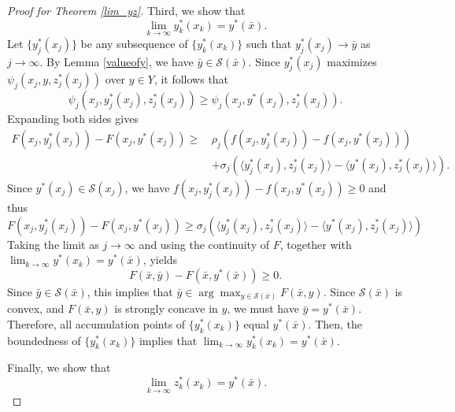 \documentclass[10pt,a4paper]{amsart}
\begin{document}
\begin{proof}[Proof for Theorem \ref{lim_yz}]
Third, we show that
\[
    \lim_{k \to\infty}y_k^*(x_k)=y^*(\bar{x}).
\]
Let $\{y_j^*(x_j)\}$ be any subsequence of $\{y_k^*(x_k)\}$ such that $y_j^*(x_j) \rightarrow \bar{y}$ as $j \rightarrow \infty$.
By Lemma \ref{valueofy}, we have $\bar{y} \in \mathcal{S}(\bar{x})$.
Since $y_j^*(x_j)$ maximizes $\psi_{j}(x_j, y, z_j^*(x_j))$ over $y \in Y$, it follows that
\[
\psi_{j}(x_j, y_j^*(x_j), z_j^*(x_j)) \ge \psi_{j}(x_j, y^*(x_j), z_j^*(x_j)). 
\]
Expanding both sides gives
\[
\begin{aligned}
    F(x_{j},y_{j}^*(x_{j}))-F(x_{j}, y^*(x_j)) \ge \, &\rho_{j}\left( f(x_{j}, y_{j}^*(x_{j}))-f(x_{j},y^*(x_j))\right) \\
    &+\sigma_{j}\left(\langle y_{j}^*(x_{j}), z_j^*(x_j)\rangle-\langle y^*(x_j), z_j^*(x_j)\rangle \right).
\end{aligned}
\]
Since $y^*(x_j) \in \mathcal{S}(x_j)$, we have $f(x_{j}, y_{j}^*(x_{j}))-f(x_{j},y^*(x_j)) \ge 0$ and thus
\[
 F(x_{j},y_{j}^*(x_{j}))-F(x_{j}, y^*(x_j)) \ge \sigma_{j}\left(\langle y_{j}^*(x_{j}), z_j^*(x_j)\rangle-\langle y^*(x_j), z_j^*(x_j)\rangle \right)
\]
Taking the limit as $j \rightarrow \infty$ and using the continuity of $F$, together with $ \lim_{k \to\infty}y^*(x_k)=y^*(\bar{x})$, yields
\[
F( \bar{x}, \bar{y} ) - F(\bar{x}, y^*(\bar{x})) \ge 0.
\]
Since $\bar{y} \in \mathcal{S}(\bar{x})$, this implies that $\bar{y} \in \arg\max_{y\in\mathcal{S}(\bar{x})}F(\bar{x},y) $. Since $\mathcal{S}(\bar{x})$ is convex, and $F(\bar{x},y)$ is strongly concave in $y$, we must have $\bar{y} = y^*(\bar{x})$.
Therefore, all accumulation points of $\{y_k^*(x_k)\}$ equal $y^*(\bar{x})$. Then, the boundedness of $\{y_k^*(x_k)\}$ implies that $\lim_{k \to\infty}y_k^*(x_k)=y^*(\bar{x})$.

Finally, we show that
\[
    \lim_{k \to\infty} z_k^*(x_k)=y^*(\bar{x}).
\]


\end{proof}
\end{document}

